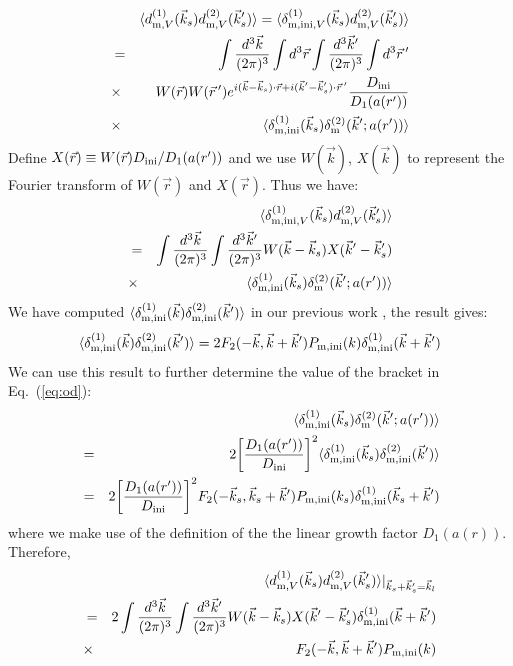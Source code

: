 \documentclass[prd,amsmath,amssymb,floatfix,superscriptaddress,nofootinbib,twocolumn]{revtex4-1}
\def\be{\begin{equation}}
\def\ee{\end{equation}}
\def\bea{\begin{eqnarray}}
\def\eea{\end{eqnarray}}
\newcommand{\ini}{\rm ini}
\newcommand{\vrr}{\vec{r}}
\newcommand{\vs}{\nonumber\\}
\newcommand{\vk}{\vec{k}}
\newcommand{\ec}[1]{Eq.~(\ref{eq:#1})}
\newcommand{\eql}[1]{\label{eq:#1}}
\begin{document}
\bea 
&&\langle d^{(1)}_{{\rm m},V}(\vk_s)d^{(2)}_{{\rm m},V}(\vk_s') \rangle = \langle \delta_{{\rm m,ini},V}^{(1)}(\vk_s)d^{(2)}_{{\rm m},V}(\vk_s') \rangle \vs 
&=& \int \frac{d^{3}\vk}{(2\pi)^3} \int d^{3} \vrr \int \frac{d^{3}\vk'}{(2\pi)^3} \int d^{3} \vrr\,'\vs 
&\times &W(\vrr)W(\vrr\,')e^{i(\vk-\vk_s)\cdot \vrr + i(\vk'-\vk_s')\cdot \vrr\,'} \frac{D_{\ini}}{D_{1}(a(r'))}  \vs
&\times &\langle \dmi^{(1)}(\vk_s)\delta_{\rm m}^{(2)}(\vk';a(r')) \rangle \eql{od}
\eea 
Define $X(\vrr)\equiv W(\vrr)D_{\ini}/D_{1}(a(r'))$ and we use $W(\vec{k})$, $X(\vec{k})$ to represent the Fourier transform of $W(\vrr)$ and $X(\vrr)$. Thus we have:
\bea 
&&\langle \delta_{{\rm m,ini},V}^{(1)}(\vk_s)d^{(2)}_{{\rm m},V}(\vk_s') \rangle \vs 
&=&  \int \frac{d^{3}\vk}{(2\pi)^3}  \int \frac{d^{3}\vk'}{(2\pi)^3} W(\vec{k}-\vec{k}_s)X(\vk'-\vk_s')\vs
&\times & \langle \dmi^{(1)}(\vk_s)\delta_{\rm m}^{(2)}(\vk';a(r')) \rangle 
\eea 
We have computed $\langle \delta_{\rm m,ini}^{(1)}(\vk)\delta_{\rm m,ini}^{(2)}(\vk') \rangle$ in our previous work \cite{Li:2020fir}, the result gives:
\be
\langle \delta_{\rm m,ini}^{(1)}(\vk)\delta_{\rm m,ini}^{(2)}(\vk') \rangle =2F_{2}(-\vk,\vk+\vk')P_{\rm m,ini}(k)\delta_{\rm m,ini}^{(1)}(\vk+\vk') 
\ee
We can use this result to further determine the value of the bracket in \ec{od}:
\bea 
&&\langle \dmi^{(1)}(\vk_s)\delta_{\rm m}^{(2)}(\vk';a(r')) \rangle \vs
&=&2\bigg[\frac{D_{1}(a(r'))}{D_{\ini}} \bigg]^{2}\langle \delta_{\rm m,ini}^{(1)}(\vk_s)\delta_{\rm m,ini}^{(2)}(\vk') \rangle  \vs 
&=&2\bigg[\frac{D_{1}(a(r'))}{D_{\ini}} \bigg]^{2}F_{2}(-\vk_s,\vk_s+\vk')P_{\rm m,\ini}(k_s)\dmi^{(1)}(\vk_s+\vk') \eql{odb} \vs
\eea 
where we make use of the definition of the the linear growth factor $D_1(a(r))$. %
Therefore,
\begin{eqnarray}
&&\langle d_{{\rm m},V}^{(1)}(\vec{k}_s) d_{{\rm m},V}^{(2)}(\vec{k}'_s) \rangle|_{\vk_s+\vk_s'=\vk_l} \nonumber \\
&=&2\int \frac{d^3 \vec{k}}{(2\pi)^3}\int \frac{d^3 \vec{k}'}{(2\pi)^3}{W}(\vec{k}-\vec{k}_s)X(\vec{k}'-\vec{k}'_s)\delta^{(1)}_{\rm m,ini}(\vec{k}+\vec{k}')\nonumber \\
&\times &F_{2}(-\vec{k},\vec{k}+\vec{k}')P_{\rm m,ini}(k)
\end{eqnarray}
\end{document}
